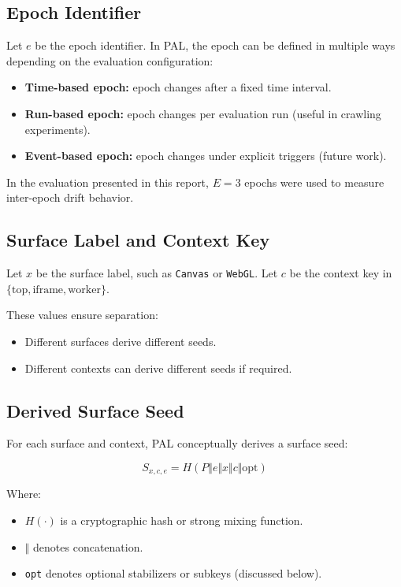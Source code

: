 \documentclass[11pt]{report}
\begin{document}
\subsection{Epoch Identifier}

Let $e$ be the epoch identifier. In PAL, the epoch can be defined in multiple ways depending on the evaluation configuration:

\begin{itemize}
    \item \textbf{Time-based epoch:} epoch changes after a fixed time interval.
    \item \textbf{Run-based epoch:} epoch changes per evaluation run (useful in crawling experiments).
    \item \textbf{Event-based epoch:} epoch changes under explicit triggers (future work).
\end{itemize}

In the evaluation presented in this report, $E=3$ epochs were used to measure inter-epoch drift behavior.

\subsection{Surface Label and Context Key}

Let $x$ be the surface label, such as \texttt{Canvas} or \texttt{WebGL}. Let $c$ be the context key in $\{\text{top},\text{iframe},\text{worker}\}$.

These values ensure separation:
\begin{itemize}
    \item Different surfaces derive different seeds.
    \item Different contexts can derive different seeds if required.
\end{itemize}

\subsection{Derived Surface Seed}

For each surface and context, PAL conceptually derives a surface seed:

\[
S_{x,c,e} = H\left(P \Vert e \Vert x \Vert c \Vert \text{opt}\right)
\]

Where:
\begin{itemize}
    \item $H(\cdot)$ is a cryptographic hash or strong mixing function.
    \item $\Vert$ denotes concatenation.
    \item \texttt{opt} denotes optional stabilizers or subkeys (discussed below).
\end{itemize}
\end{document}
